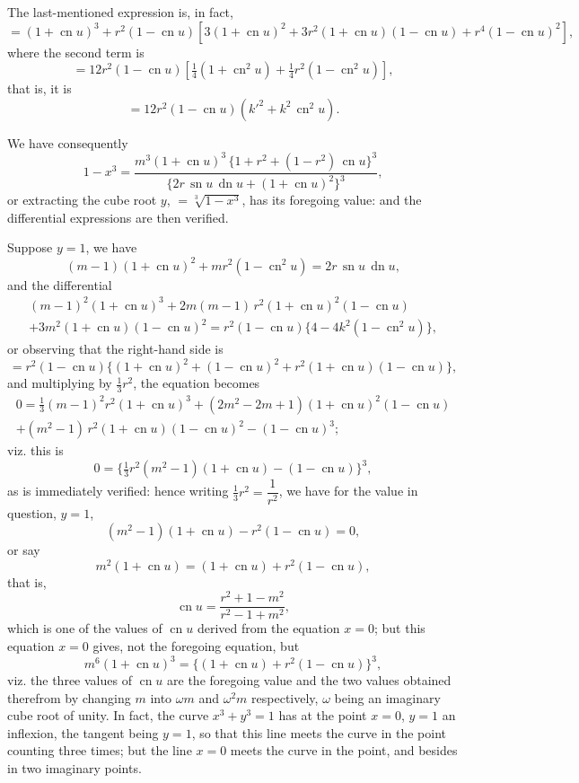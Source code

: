 \documentclass[11pt,a4paper]{book}
\begin{document}
The last-mentioned expression is, in fact,
\[
= (1+\operatorname{cn} u)^3 + r^2(1-\operatorname{cn} u)[3(1+\operatorname{cn} u)^2 + 3r^2(1+\operatorname{cn} u)(1-\operatorname{cn} u) + r^4(1-\operatorname{cn} u)^2],
\]
where the second term is
\[
= 12r^2(1-\operatorname{cn} u)[\tfrac{1}{4}(1+\operatorname{cn}^2 u) + \tfrac{1}{4}r^2(1-\operatorname{cn}^2 u)],
\]
that is, it is
\[
= 12r^2(1-\operatorname{cn} u)(k'^2 + k^2\,\operatorname{cn}^2 u).
\]

We have consequently
\[
1-x^3 = \frac{m^3(1+\operatorname{cn} u)^3\,\{1+r^2+(1-r^2)\,\operatorname{cn} u\}^3}{\{2r\,\operatorname{sn} u\,\operatorname{dn} u + (1+\operatorname{cn} u)^2\}^3},
\]
or extracting the cube root $y$, $= \sqrt[3]{1-x^3}$, has its foregoing value: and the differential expressions are then verified.

Suppose $y=1$, we have
\[
(m-1)(1+\operatorname{cn} u)^2 + mr^2(1-\operatorname{cn}^2 u) = 2r\,\operatorname{sn} u\,\operatorname{dn} u,
\]
and the differential
\begin{multline*}
(m-1)^2(1+\operatorname{cn} u)^3 + 2m(m-1)\,r^2(1+\operatorname{cn} u)^2(1-\operatorname{cn} u)\\
+ 3m^2(1+\operatorname{cn} u)(1-\operatorname{cn} u)^2 = r^2(1-\operatorname{cn} u)\{4 - 4k^2(1-\operatorname{cn}^2 u)\},
\end{multline*}
or observing that the right-hand side is
\[
= r^2(1-\operatorname{cn} u)\{(1+\operatorname{cn} u)^2 + (1-\operatorname{cn} u)^2 + r^2(1+\operatorname{cn} u)(1-\operatorname{cn} u)\},
\]
and multiplying by $\tfrac{1}{3}r^2$, the equation becomes
\begin{multline*}
0 = \tfrac{1}{3}(m-1)^2 r^2 (1+\operatorname{cn} u)^3 + (2m^2 - 2m + 1)(1+\operatorname{cn} u)^2(1-\operatorname{cn} u)\\
+ (m^2-1)\,r^2(1+\operatorname{cn} u)(1-\operatorname{cn} u)^2 - (1-\operatorname{cn} u)^3;
\end{multline*}
viz. this is
\[
0 = \{\tfrac{1}{3}r^2(m^2-1)(1+\operatorname{cn} u) - (1-\operatorname{cn} u)\}^3,
\]
as is immediately verified: hence writing $\tfrac{1}{3}r^2 = \dfrac{1}{r^2}$, we have for the value in question, $y=1$,
\[
(m^2-1)(1+\operatorname{cn} u) - r^2(1-\operatorname{cn} u) = 0,
\]
or say
\[
m^2(1+\operatorname{cn} u) = (1+\operatorname{cn} u) + r^2(1-\operatorname{cn} u),
\]
that is,
\[
\operatorname{cn} u = \frac{r^2 + 1 - m^2}{r^2 - 1 + m^2},
\]
which is one of the values of $\operatorname{cn} u$ derived from the equation $x=0$; but this equation $x=0$ gives, not the foregoing equation, but
\[
m^6(1+\operatorname{cn} u)^3 = \{(1+\operatorname{cn} u) + r^2(1-\operatorname{cn} u)\}^3,
\]
viz. the three values of $\operatorname{cn} u$ are the foregoing value and the two values obtained therefrom by changing $m$ into $\omega m$ and $\omega^2 m$ respectively, $\omega$ being an imaginary cube root of unity. In fact, the curve $x^3 + y^3 = 1$ has at the point $x=0$, $y=1$ an inflexion, the tangent being $y=1$, so that this line meets the curve in the point counting three times; but the line $x=0$ meets the curve in the point, and besides in two imaginary points.
\end{document}
